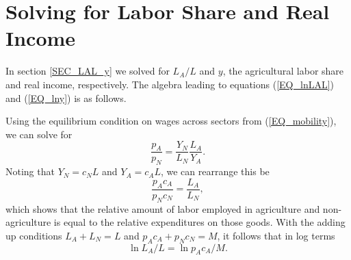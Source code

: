 \documentclass[11pt]{article}
\begin{document}
\newpage
\clearpage

\setcounter{section}{0}
\renewcommand{\thesection}{Appendix \Alph{section}}

\singlespacing

\section{Solving for Labor Share and Real Income}
In section \ref{SEC_LAL_y} we solved for $L_A/L$ and $y$, the agricultural labor share and real income, respectively. The algebra leading to equations (\ref{EQ_lnLAL}) and (\ref{EQ_lny}) is as follows.

Using the equilibrium condition on wages across sectors from (\ref{EQ_mobility}), we can solve for 
\begin{equation}
    \frac{p_A}{p_N} = \frac{Y_N}{L_N}\frac{L_A}{Y_A}.\label{EQ_papn}
\end{equation}
Noting that $Y_N = c_N L$ and $Y_A = c_A L$, we can rearrange this be
\begin{equation}
    \frac{p_A c_A}{p_N c_N} = \frac{L_A}{L_N}, \label{EQ_expend}
\end{equation}
which shows that the relative amount of labor employed in agriculture and non-agriculture is equal to the relative expenditures on those goods. With the adding up conditions $L_A + L_N = L$ and $p_Ac_A + p_N c_N = M$, it follows that in log terms
\begin{equation}
    \ln L_A/L = \ln p_A c_A/M. \label{EQ_pacaM}
\end{equation}
\end{document}
